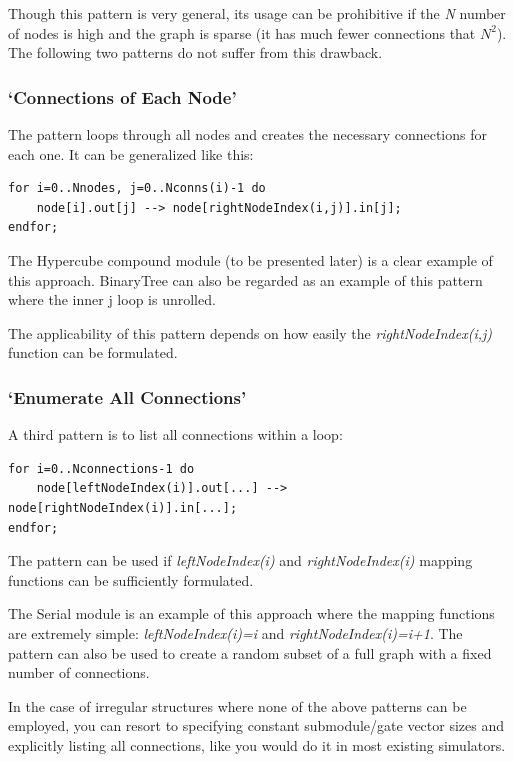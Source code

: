 Though this pattern is very general, its usage can be prohibitive if
the \textit{N} number of nodes is high and the graph is sparse (it has
much fewer connections that $N^2$). The following
two patterns do not suffer from this drawback.


\subsubsection{`Connections of Each Node'}

The pattern loops through all nodes and creates the necessary
connections for each one. It can be generalized like this:

\begin{Verbatim}[commandchars=\\\{\}]
for i=0..Nnodes, j=0..Nconns(i)-1 do
    node[i].out[j] --> node[rightNodeIndex(i,j)].in[j];
endfor;
\end{Verbatim}

The Hypercube compound module (to be
presented later) is a clear example of this approach. BinaryTree can
also be regarded as an example of this pattern where the inner j loop
is unrolled.

The applicability of this pattern depends on how easily the \textit{rightNodeIndex(i,j)}
function can be formulated.


\subsubsection{`Enumerate All Connections'}


A third pattern is to list all connections within a loop:

\begin{Verbatim}[commandchars=\\\{\}]
for i=0..Nconnections-1 do
    node[leftNodeIndex(i)].out[...] --> node[rightNodeIndex(i)].in[...];
endfor;
\end{Verbatim}

The pattern can be used if \textit{leftNodeIndex(i)} and \textit{rightNodeIndex(i)}
mapping functions can be sufficiently formulated.

The Serial module is an example of this approach where the mapping
functions are extremely simple: \textit{leftNodeIndex(i)=i} and \textit{rightNodeIndex(i)=i+1}.
The pattern can also be used to create a random subset of a full
graph with a fixed number of connections.

In the case of irregular structures where none of the above patterns
can be employed, you can resort to specifying constant submodule/gate
vector sizes and explicitly listing all connections, like you
would do it in most existing simulators.




